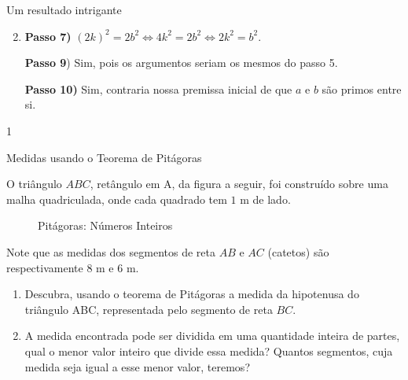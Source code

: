\clearmargin
\begin{answer}{Um resultado intrigante}
{
\begin{enumerate}\setcounter{enumi}{1}
\item \textbf{Passo 7)} \((2k)^2 = 2b^2 \Leftrightarrow 4k^2 = 2b^2 \Leftrightarrow 2k^2=b^2\).

\textbf{Passo 9}) Sim, pois os argumentos seriam os mesmos do passo 5.

\textbf{Passo 10)} Sim, contraria nossa premissa inicial de que \(a\) e \(b\) são primos entre si.
\end{enumerate}
}{1}
\end{answer}

\begin{task}{Medidas usando o Teorema de Pitágoras}
\label{sub-ativ-pitagoras}

O triângulo $ABC$, retângulo em A, da figura a seguir, foi construído sobre uma malha quadriculada, onde cada quadrado tem $1$ m de lado.

\begin{figure}[H]
\centering
\capstart

\caption{Pitágoras: Números Inteiros}\label{\detokenize{NO103-5:id6}}\label{\detokenize{NO103-5:id16}}\end{figure}

Note que as medidas dos segmentos de reta $AB$ e $AC$ (catetos) são respectivamente $8$ m e $6$ m.
\begin{enumerate}
\item {} 
Descubra, usando o teorema de Pitágoras a medida da hipotenusa do triângulo ABC, representada pelo segmento de reta $BC$.

\item {} 
A medida encontrada pode ser dividida em uma quantidade inteira de partes, qual o menor valor inteiro que divide essa medida? Quantos segmentos, cuja medida seja igual a esse menor valor, teremos?


\end{enumerate}
\end{task}
